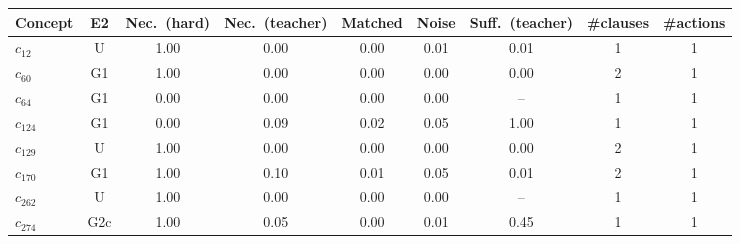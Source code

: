 \begin{tabular}{lcccccccc}
\toprule
Concept & E2 & Nec.\ (hard) & Nec.\ (teacher) & Matched & Noise & Suff.\ (teacher) & \#clauses & \#actions \\
\midrule
$c_{12}$ & U & 1.00 & 0.00 & 0.00 & 0.01 & 0.01 & 1 & 1 \\
$c_{60}$ & G1 & 1.00 & 0.00 & 0.00 & 0.00 & 0.00 & 2 & 1 \\
$c_{64}$ & G1 & 0.00 & 0.00 & 0.00 & 0.00 & -- & 1 & 1 \\
$c_{124}$ & G1 & 0.00 & 0.09 & 0.02 & 0.05 & 1.00 & 1 & 1 \\
$c_{129}$ & U & 1.00 & 0.00 & 0.00 & 0.00 & 0.00 & 2 & 1 \\
$c_{170}$ & G1 & 1.00 & 0.10 & 0.01 & 0.05 & 0.01 & 2 & 1 \\
$c_{262}$ & U & 1.00 & 0.00 & 0.00 & 0.00 & -- & 1 & 1 \\
$c_{274}$ & G2c & 1.00 & 0.05 & 0.00 & 0.01 & 0.45 & 1 & 1 \\
\bottomrule
\end{tabular}